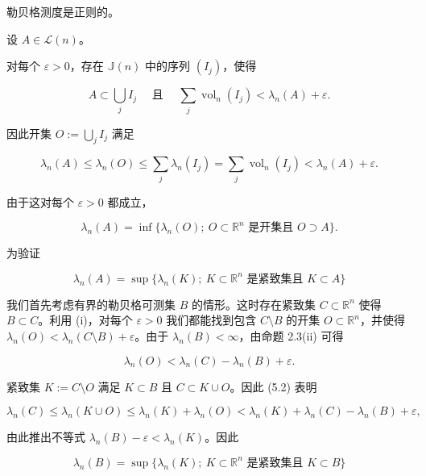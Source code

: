 \begin{theorem}

勒贝格测度是正则的。

\proofhead
设 $ A \in \mathcal{L}(n) $。

\begin{subitems}
\item

对每个 $ \varepsilon > 0 $，存在 $ \mathbb{J}(n) $ 中的序列 $ (I_j) $，使得

\[
A \subset \bigcup_j I_j \quad \text{ 且 } \quad \sum_j \operatorname{vol}_n(I_j) < \lambda_n(A) + \varepsilon .
\]

因此开集 $ O := \bigcup_j I_j $ 满足

\begin{equation}
\lambda_n(A) \le \lambda_n(O) \le \sum_j \lambda_n(I_j) = \sum_j \operatorname{vol}_n(I_j) < \lambda_n(A) + \varepsilon .\tag{5.1}
\end{equation}

由于这对每个 $ \varepsilon > 0 $ 都成立，

\[
\lambda_n(A) = \inf \{ \lambda_n(O) ; \ O \subset \mathbb{R}^n \text{ 是开集且 } O \supset A \} .
\]
\item

为验证

\[
\lambda_n(A) = \sup \{ \lambda_n(K) ; \ K \subset \mathbb{R}^n \text{ 是紧致集且 } K \subset A \}
\]

我们首先考虑有界的勒贝格可测集 $ B $ 的情形。这时存在紧致集 $ C \subset \mathbb{R}^n $ 使得 $ B \subset C $。利用 (i)，对每个 $ \varepsilon > 0 $ 我们都能找到包含 $ C \setminus B $ 的开集 $ O \subset \mathbb{R}^n $，并使得 $ \lambda_n(O) < \lambda_n(C \setminus B) + \varepsilon $。由于 $ \lambda_n(B) < \infty $，由命题 2.3(ii) 可得

\begin{equation}
\lambda_n(O) < \lambda_n(C) - \lambda_n(B) + \varepsilon .\tag{5.2}
\end{equation}

紧致集 $ K := C \setminus O $ 满足 $ K \subset B $ 且 $ C \subset K \cup O $。因此 (5.2) 表明

\[
\lambda_n(C) \le \lambda_n(K \cup O) \le \lambda_n(K) + \lambda_n(O) < \lambda_n(K) + \lambda_n(C) - \lambda_n(B) + \varepsilon ,
\]

由此推出不等式 $ \lambda_n(B) - \varepsilon < \lambda_n(K) $。因此

\[
\lambda_n(B) = \sup \{ \lambda_n(K) ; \ K \subset \mathbb{R}^n \text{ 是紧致集且 } K \subset B \}
\]


\end{subitems}
\end{theorem}
